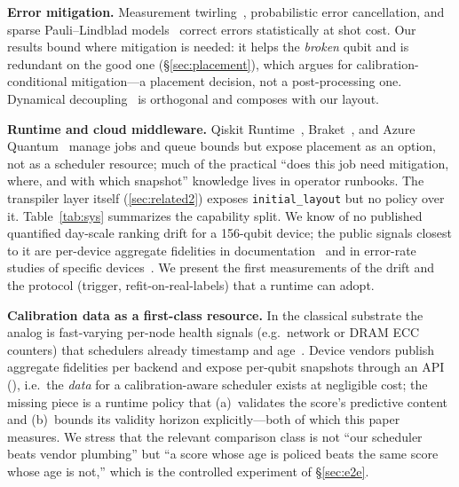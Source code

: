 \documentclass[journal,10pt,twocolumn]{IEEEtran}
\begin{document}
\textbf{Error mitigation.} Measurement twirling~\cite{nation2023,bravyi2021meas}, probabilistic error cancellation,
and sparse Pauli--Lindblad models~\cite{vanberg2023,temme2017} correct errors statistically at shot cost. Our results
bound where mitigation is needed: it helps the \emph{broken} qubit and is redundant on the good one
(\S\ref{sec:placement}), which argues for calibration-conditional mitigation---a placement decision, not a
post-processing one. Dynamical decoupling~\cite{viola1999dd} is orthogonal and composes with our layout.

\textbf{Runtime and cloud middleware.} Qiskit Runtime~\cite{ibmrtime}, Braket~\cite{braket}, and Azure
Quantum~\cite{azureq} manage jobs and queue bounds but expose placement as an option, not as a scheduler resource;
much of the practical ``does this job need mitigation, where, and with which snapshot'' knowledge lives in operator
runbooks. The transpiler layer itself (\ref{sec:related2}) exposes \texttt{initial\_layout} but no policy over it.
Table~\ref{tab:sys} summarizes the capability split. We know of no published quantified day-scale ranking drift for a
156-qubit device; the public signals closest to it are per-device aggregate fidelities in
documentation~\cite{ibmcalib} and in error-rate studies of specific devices~\cite{kim2023utility}. We present the
first measurements of the drift and the protocol (trigger, refit-on-real-labels) that a runtime can adopt.

\textbf{Calibration data as a first-class resource.} In the classical substrate the analog is fast-varying per-node
health signals (e.g.\ network or DRAM ECC counters) that schedulers already timestamp and age~\cite{lao2022timing}.
Device vendors publish aggregate fidelities per backend and expose per-qubit snapshots through an API
(\cite{ibmcalib}), i.e.\ the \emph{data} for a calibration-aware scheduler exists at negligible cost; the missing
piece is a runtime policy that (a)~validates the score's predictive content and (b)~bounds its validity horizon
explicitly---both of which this paper measures. We stress that the relevant comparison class is not ``our
scheduler beats vendor plumbing'' but ``a score whose age is policed beats the same score whose age is not,'' which
is the controlled experiment of \S\ref{sec:e2e}.
\end{document}
